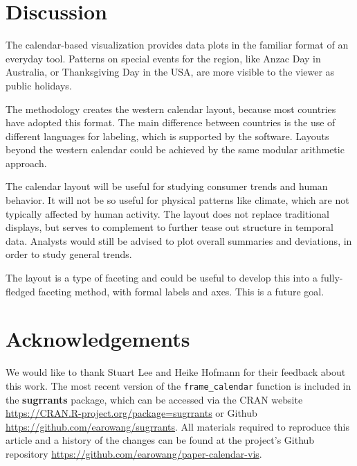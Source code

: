 \documentclass[12pt]{article}
\begin{document}
\hypertarget{discussion}{%
\section{Discussion}\label{discussion}}

\label{sec:discussion}

The calendar-based visualization provides data plots in the familiar
format of an everyday tool. Patterns on special events for the region,
like Anzac Day in Australia, or Thanksgiving Day in the USA, are more
visible to the viewer as public holidays.

The methodology creates the western calendar layout, because most
countries have adopted this format. The main difference between
countries is the use of different languages for labeling, which is
supported by the software. Layouts beyond the western calendar could be
achieved by the same modular arithmetic approach.

The calendar layout will be useful for studying consumer trends and
human behavior. It will not be so useful for physical patterns like
climate, which are not typically affected by human activity. The layout
does not replace traditional displays, but serves to complement to
further tease out structure in temporal data. Analysts would still be
advised to plot overall summaries and deviations, in order to study
general trends.

The layout is a type of faceting and could be useful to develop this
into a fully-fledged faceting method, with formal labels and axes. This
is a future goal.

\hypertarget{acknowledgements}{%
\section*{Acknowledgements}\label{acknowledgements}}

We would like to thank Stuart Lee and Heike Hofmann for their feedback
about this work. The most recent version of the \texttt{frame\_calendar}
function is included in the \textbf{sugrrants} package, which can be
accessed via the CRAN website
\url{https://CRAN.R-project.org/package=sugrrants} or Github
\url{https://github.com/earowang/sugrrants}. All materials required to
reproduce this article and a history of the changes can be found at the
project's Github repository
\url{https://github.com/earowang/paper-calendar-vis}.



\end{document}
